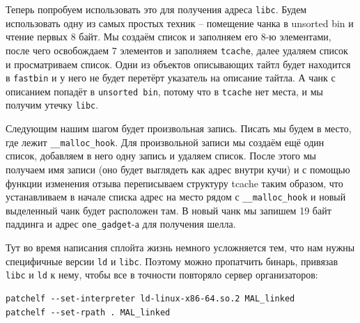 \documentclass[idxtotoc,hyperref,openany,oneside]{files/pwn} %
\begin{document}
Теперь попробуем использовать это для получения адреса \verb|libc|. Будем использовать одну из самых простых техник – помещение чанка в unsorted bin и чтение первых $8$ байт. Мы создаём список и заполняем его $8$-ю элементами, после чего освобождаем $7$ элементов и заполняем \verb|tcache|, далее удаляем список и просматриваем список. Одни из объектов описывающих тайтл будет находится в \verb|fastbin| и у него не будет перетёрт указатель на описание тайтла. А чанк с описанием попадёт в \verb|unsorted bin|, потому что в \verb|tcache| нет места, и мы получим утечку \verb|libc|.

Следующим нашим шагом будет произвольная запись. Писать мы будем в место, где лежит \verb|__malloc_hook|. Для произвольной записи мы создаём ещё один список, добавляем в него одну запись и удаляем список. После этого мы получаем имя записи (оно будет выглядеть как адрес внутри кучи) и с помощью функции изменения отзыва переписываем структуру tcache таким образом, что устанавливаем в начале списка адрес на место рядом с \verb|__malloc_hook| и новый выделенный чанк будет расположен там. В новый чанк мы запишем 19 байт паддинга и адрес \verb|one_gadget|-а для получения шелла.

Тут во время написания сплойта жизнь немного усложняется тем, что нам нужны специфичные версии \verb|ld| и \verb|libc|. Поэтому можно пропатчить бинарь, привязав \verb|libc| и \verb|ld| к нему, чтобы все в точности повторяло сервер организаторов:
\begin{verbatim}
patchelf --set-interpreter ld-linux-x86-64.so.2 MAL_linked
patchelf --set-rpath . MAL_linked
\end{verbatim}
\end{document}
